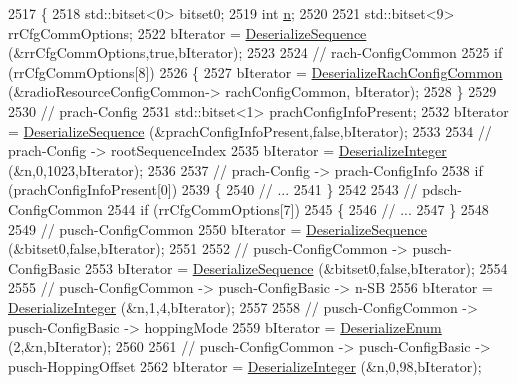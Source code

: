 \begin{DoxyCode}
2517 \{
2518   std::bitset<0> bitset0;
2519   \textcolor{keywordtype}{int} \hyperlink{namespacesample-rng-plot_aeb5ee5c431e338ef39b7ac5431242e1d}{n};
2520 
2521   std::bitset<9> rrCfgCommOptions;
2522   bIterator = \hyperlink{classns3_1_1Asn1Header_a58c68bb97ba3fe2e8fcdd7c208d672b2}{DeserializeSequence} (&rrCfgCommOptions,\textcolor{keyword}{true},bIterator);
2523 
2524   \textcolor{comment}{// rach-ConfigCommon}
2525   \textcolor{keywordflow}{if} (rrCfgCommOptions[8])
2526     \{
2527       bIterator = \hyperlink{classns3_1_1RrcAsn1Header_a4fb01dd5cdf7fce787facd85783c812a}{DeserializeRachConfigCommon} (&radioResourceConfigCommon->
      rachConfigCommon, bIterator);
2528     \}
2529 
2530   \textcolor{comment}{// prach-Config}
2531   std::bitset<1> prachConfigInfoPresent;
2532   bIterator = \hyperlink{classns3_1_1Asn1Header_a58c68bb97ba3fe2e8fcdd7c208d672b2}{DeserializeSequence} (&prachConfigInfoPresent,\textcolor{keyword}{false},bIterator);
2533 
2534   \textcolor{comment}{// prach-Config -> rootSequenceIndex}
2535   bIterator = \hyperlink{classns3_1_1Asn1Header_a49802c9af30018b078150e866b6ecae2}{DeserializeInteger} (&n,0,1023,bIterator);
2536 
2537   \textcolor{comment}{// prach-Config -> prach-ConfigInfo}
2538   \textcolor{keywordflow}{if} (prachConfigInfoPresent[0])
2539     \{
2540       \textcolor{comment}{// ...}
2541     \}
2542 
2543   \textcolor{comment}{// pdsch-ConfigCommon}
2544   \textcolor{keywordflow}{if} (rrCfgCommOptions[7])
2545     \{
2546       \textcolor{comment}{// ...}
2547     \}
2548 
2549   \textcolor{comment}{// pusch-ConfigCommon}
2550   bIterator = \hyperlink{classns3_1_1Asn1Header_a58c68bb97ba3fe2e8fcdd7c208d672b2}{DeserializeSequence} (&bitset0,\textcolor{keyword}{false},bIterator);
2551 
2552   \textcolor{comment}{// pusch-ConfigCommon -> pusch-ConfigBasic}
2553   bIterator = \hyperlink{classns3_1_1Asn1Header_a58c68bb97ba3fe2e8fcdd7c208d672b2}{DeserializeSequence} (&bitset0,\textcolor{keyword}{false},bIterator);
2554 
2555   \textcolor{comment}{// pusch-ConfigCommon -> pusch-ConfigBasic -> n-SB}
2556   bIterator = \hyperlink{classns3_1_1Asn1Header_a49802c9af30018b078150e866b6ecae2}{DeserializeInteger} (&n,1,4,bIterator);
2557 
2558   \textcolor{comment}{// pusch-ConfigCommon -> pusch-ConfigBasic -> hoppingMode}
2559   bIterator = \hyperlink{classns3_1_1Asn1Header_a4fcc253e0eec3483c775b005c1875f2d}{DeserializeEnum} (2,&n,bIterator);
2560 
2561   \textcolor{comment}{// pusch-ConfigCommon -> pusch-ConfigBasic -> pusch-HoppingOffset}
2562   bIterator = \hyperlink{classns3_1_1Asn1Header_a49802c9af30018b078150e866b6ecae2}{DeserializeInteger} (&n,0,98,bIterator);

\end{DoxyCode}

